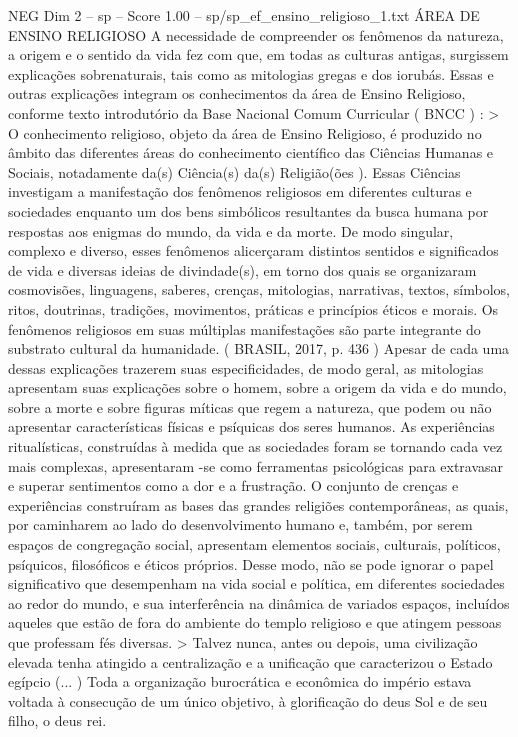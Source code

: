 \begin{textsample}{NEG Dim 2 – sp – Score 1.00 – sp/sp\_ef\_ensino\_religioso\_1.txt}  \label{ex:f2_neg_082}
ÁREA DE ENSINO RELIGIOSO A necessidade de compreender os fenômenos da natureza, a origem e o sentido da vida fez com que, em todas as culturas antigas, surgissem explicações sobrenaturais, tais como as mitologias gregas e dos iorubás.
Essas e outras explicações integram os conhecimentos da área de Ensino Religioso, conforme texto introdutório da Base Nacional Comum Curricular ( BNCC ) : > O conhecimento religioso, objeto da área de Ensino Religioso, é produzido no âmbito das diferentes áreas do conhecimento científico das Ciências Humanas e Sociais, notadamente da(s) Ciência(s) da(s) Religião(ões ).
Essas Ciências investigam a manifestação dos fenômenos religiosos em diferentes culturas e sociedades enquanto um dos bens simbólicos resultantes da busca humana por respostas aos enigmas do mundo, da vida e da morte.
De modo singular, complexo e diverso, esses fenômenos alicerçaram distintos sentidos e significados de vida e diversas ideias de divindade(s), em torno dos quais se organizaram cosmovisões, linguagens, saberes, crenças, mitologias, narrativas, textos, símbolos, ritos, doutrinas, tradições, movimentos, práticas e princípios éticos e morais.
Os fenômenos religiosos em suas múltiplas manifestações são parte integrante do substrato cultural da humanidade. ( BRASIL, 2017, p. 436 ) Apesar de cada uma dessas explicações trazerem suas especificidades, de modo geral, as mitologias apresentam suas explicações sobre o homem, sobre a origem da vida e do mundo, sobre a morte e sobre figuras míticas que regem a natureza, que podem ou não apresentar características físicas e psíquicas dos seres humanos.
As experiências ritualísticas, construídas à medida que as sociedades foram se tornando cada vez mais complexas, apresentaram -se como ferramentas psicológicas para extravasar e superar sentimentos como a dor e a frustração.
O conjunto de crenças e experiências construíram as bases das grandes religiões contemporâneas, as quais, por caminharem ao lado do desenvolvimento humano e, também, por serem espaços de congregação social, apresentam elementos sociais, culturais, políticos, psíquicos, filosóficos e éticos próprios.
Desse modo, não se pode ignorar o papel significativo que desempenham na vida social e política, em diferentes sociedades ao redor do mundo, e sua interferência na dinâmica de variados espaços, incluídos aqueles que estão de fora do ambiente do templo religioso e que atingem pessoas que professam fés diversas. > Talvez nunca, antes ou depois, uma civilização elevada tenha atingido a centralização e a unificação que caracterizou o Estado egípcio (... ) Toda a organização burocrática e econômica do império estava voltada à consecução de um único objetivo, à glorificação do deus Sol e de seu filho, o deus rei.

\end{textsample}

